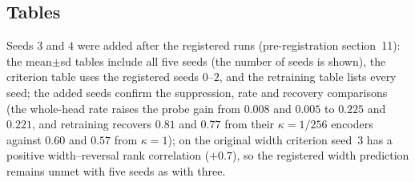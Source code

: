 \subsection{Tables}
Seeds $3$ and $4$ were added after the registered runs (pre-registration section~11):
the mean$\pm$sd tables include all five seeds (the number of seeds is shown), the criterion
table uses the registered seeds $0$--$2$, and the retraining table lists every seed; the added
seeds confirm the suppression, rate and recovery comparisons (the whole-head rate raises the probe
gain from $0.008$ and $0.005$ to $0.225$ and $0.221$, and retraining recovers $0.81$ and $0.77$
from their $\kappa=1/256$ encoders against $0.60$ and $0.57$ from $\kappa=1$); on the original
width criterion seed~$3$ has a positive width--reversal rank correlation ($+0.7$), so the
registered width prediction remains unmet with five seeds as with three.
